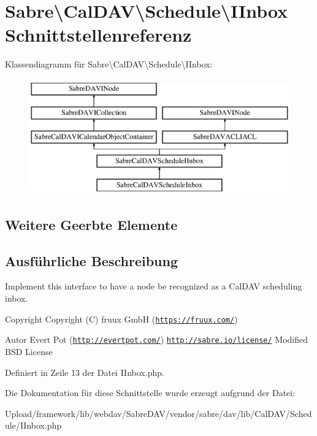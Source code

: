 \hypertarget{interface_sabre_1_1_cal_d_a_v_1_1_schedule_1_1_i_inbox}{}\section{Sabre\textbackslash{}Cal\+D\+AV\textbackslash{}Schedule\textbackslash{}I\+Inbox Schnittstellenreferenz}
\label{interface_sabre_1_1_cal_d_a_v_1_1_schedule_1_1_i_inbox}
Klassendiagramm für Sabre\textbackslash{}Cal\+D\+AV\textbackslash{}Schedule\textbackslash{}I\+Inbox\+:\begin{figure}[H]
\begin{center}
\leavevmode
\includegraphics[height=5.000000cm]{interface_sabre_1_1_cal_d_a_v_1_1_schedule_1_1_i_inbox}
\end{center}
\end{figure}
\subsection*{Weitere Geerbte Elemente}


\subsection{Ausführliche Beschreibung}
Implement this interface to have a node be recognized as a Cal\+D\+AV scheduling inbox.

\begin{DoxyCopyright}{Copyright}
Copyright (C) fruux GmbH (\href{https://fruux.com/}{\tt https\+://fruux.\+com/}) 
\end{DoxyCopyright}
\begin{DoxyAuthor}{Autor}
Evert Pot (\href{http://evertpot.com/}{\tt http\+://evertpot.\+com/})  \href{http://sabre.io/license/}{\tt http\+://sabre.\+io/license/} Modified B\+SD License 
\end{DoxyAuthor}


Definiert in Zeile 13 der Datei I\+Inbox.\+php.



Die Dokumentation für diese Schnittstelle wurde erzeugt aufgrund der Datei\+:\begin{DoxyCompactItemize}
\item 
Upload/framework/lib/webdav/\+Sabre\+D\+A\+V/vendor/sabre/dav/lib/\+Cal\+D\+A\+V/\+Schedule/I\+Inbox.\+php\end{DoxyCompactItemize}
